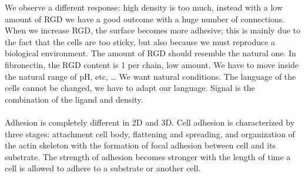 \noindent
We observe a different response: high density is too much,  instead with a low amount of RGD we have a good outcome with a huge number of connections. When we increase RGD, the surface becomes more adhesive; this is mainly due to the fact that the cells are too sticky, but also because we must reproduce a biological environment. The amount of RGD should resemble the natural one. In fibronectin, the RGD content is 1 per chain, low amount. We have to move inside the natural range of pH, etc, … We want natural conditions. The language of the cells cannot be changed, we have to adapt our language. Signal is the combination of the ligand and density.
 \\
 \\
 \noindent
Adhesion is completely different in 2D and 3D. Cell adhesion is characterized by three stages: attachment cell body, flattening and spreading, and organization of the actin skeleton with the formation of focal adhesion between cell and its substrate. The strength of adhesion becomes stronger with the length of time a cell is allowed to adhere to a substrate or another cell. 

